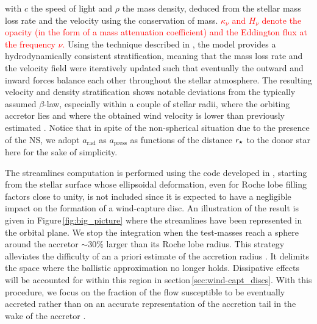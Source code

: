 \documentclass{aa}
\makeatletter
\newcommand*{\ns}{NS\@\xspace}
\newcommand{\mystar}{{\fontfamily{lmr}\selectfont$\star$}}
\makeatother
\begin{document}
with $c$ the speed of light and $\rho$ the mass density, deduced from the stellar mass loss rate and the velocity using the conservation of mass. \textcolor{red}{$\kappa_{\nu}$ and $H_{\nu}$ denote the opacity (in the form of a mass attenuation coefficient) and the Eddington flux at the frequency $\nu$.} Using the technique described in \cite{Sander2017b}, the model provides a hydrodynamically consistent stratification, meaning that the mass loss rate and the velocity field were iteratively updated such that eventually the outward and inward forces balance each other throughout the stellar atmosphere. The resulting velocity and density stratification shows notable deviations from the typically assumed $\beta$-law, especially within a couple of stellar radii, where the orbiting accretor lies and where the obtained wind velocity is lower than previously estimated \citep{Gimenez-Garcia2016}. Notice that in spite of the non-spherical situation due to the presence of the \ns, we adopt $a_\text{rad}$ as $a_\text{press}$ as functions of the distance $r_{\text{\mystar}}$ to the donor star here for the sake of simplicity.

The streamlines computation is performed using the code developed in \cite{ElMellah2016a}, starting from the stellar surface whose ellipsoidal deformation, even for Roche lobe filling factors close to unity, is not included since it is expected to have a negligible impact on the formation of a wind-capture disc. An illustration of the result is given in Figure\,\ref{fig:big_picture} where the streamlines have been represented in the orbital plane. We stop the integration when the test-masses reach a sphere around the accretor $\sim$30\% larger than its Roche lobe radius. This strategy alleviates the difficulty of an a priori estimate of the accretion radius \citep[the critical impact parameter below which test-masses are captured in the BHL formalism,][]{Edgar:2004ip}. It delimits the space where the ballistic approximation no longer holds. Dissipative effects will be accounted for within this region in section\,\ref{sec:wind-capt_discs}. With this procedure, we focus on the fraction of the flow susceptible to be eventually accreted rather than on an accurate representation of the accretion tail in the wake of the accretor \citep[for this component, see rather][]{Manousakis2013}.
\end{document}
